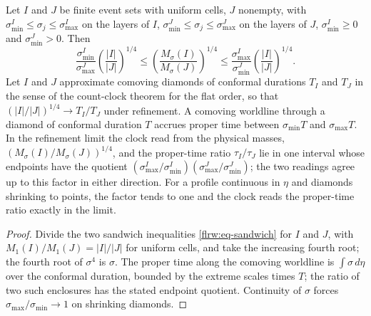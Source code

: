 \begin{corollary}
\label{flrw:count-clock}
Let $I$ and $J$ be finite event sets with uniform cells, $J$ nonempty,
with $\sigma^I_{\min}\le\sigma_j\le\sigma^I_{\max}$ on the layers of $I$,
$\sigma^J_{\min}\le\sigma_j\le\sigma^J_{\max}$ on the layers of $J$,
$\sigma^I_{\min}\ge0$ and $\sigma^J_{\min}>0$. Then
\begin{equation}
 \frac{\sigma^I_{\min}}{\sigma^J_{\max}}
 \left(\frac{|I|}{|J|}\right)^{1/4}
 \le\left(\frac{M_\sigma(I)}{M_\sigma(J)}\right)^{1/4}
 \le\frac{\sigma^I_{\max}}{\sigma^J_{\min}}
 \left(\frac{|I|}{|J|}\right)^{1/4}.
 \label{flrw:eq-clock-enclosure}
\end{equation}
Let $I$ and $J$ approximate comoving diamonds of conformal durations $T_I$
and $T_J$ in the sense of the count-clock theorem for the flat order, so
that $(|I|/|J|)^{1/4}\to T_I/T_J$ under refinement. A comoving worldline
through a diamond of conformal duration $T$ accrues proper time between
$\sigma_{\min}T$ and $\sigma_{\max}T$. In the refinement limit the clock
read from the physical masses, $(M_\sigma(I)/M_\sigma(J))^{1/4}$, and the
proper-time ratio $\tau_I/\tau_J$ lie in one interval whose endpoints have
the quotient
$(\sigma^I_{\max}/\sigma^I_{\min})(\sigma^J_{\max}/\sigma^J_{\min})$; the
two readings agree up to this factor in either direction. For a profile
continuous in $\eta$ and diamonds shrinking to points, the factor tends to
one and the clock reads the proper-time ratio exactly in the limit.
\end{corollary}
\begin{proof}
Divide the two sandwich inequalities \eqref{flrw:eq-sandwich} for $I$ and
$J$, with $M_1(I)/M_1(J)=|I|/|J|$ for uniform cells, and take the
increasing fourth root; the fourth root of $\sigma^4$ is $\sigma$. The
proper time along the comoving worldline is $\int\sigma\,d\eta$ over the
conformal duration, bounded by the extreme scales times $T$; the ratio of
two such enclosures has the stated endpoint quotient. Continuity of
$\sigma$ forces $\sigma_{\max}/\sigma_{\min}\to1$ on shrinking diamonds.
\end{proof}

